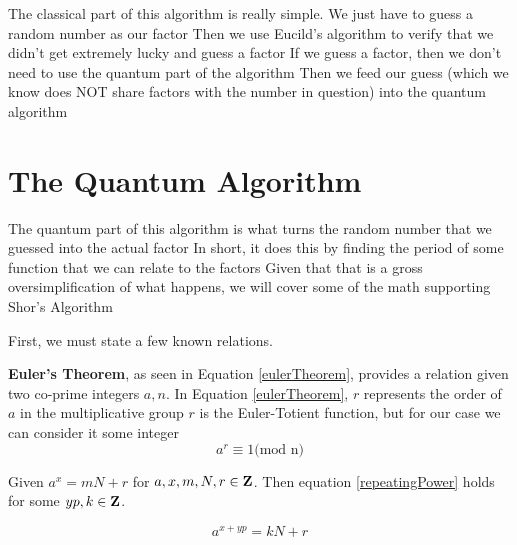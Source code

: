 \documentclass[a4paper]{article}
\begin{document}
\label{classicalSec}

The classical part of this algorithm is really simple. We just have to guess a random number as our factor
 Then we use Eucild's algorithm to verify that we didn't get extremely lucky and guess a factor
 If we guess a factor, then we don't need to use the quantum part of the algorithm
 Then we feed our guess (which we know does NOT share factors with the number in question) into the quantum algorithm




\section{The Quantum Algorithm}

\label{quantumSec}



The quantum part of this algorithm is what turns the random number that we guessed into the actual factor
 In short, it does this by finding the period of some function that we can relate to the factors
 Given that that is a gross oversimplification of what happens, we will cover some of the math supporting Shor's Algorithm


First, we must state a few known relations. 





\textbf{Euler's Theorem}, as seen in Equation \ref{eulerTheorem}, provides a relation given two co-prime integers
 $a, n$. In Equation \ref{eulerTheorem}, $r$ represents the order of $a$ in the multiplicative group
 $r$ is the Euler-Totient function, but for our case we can consider it some integer
\begin{equation}

a ^ r \equiv 1 \textrm{(mod n)}

\label{eulerTheorem}

\end{equation}





Given $a^x = mN + r$ for $a,x,m,N,r \in \mathbf{Z}$. Then equation \ref{repeatingPower} holds for some $y
 p, k \in \mathbf{Z}$.

\begin{equation}

a^{x + yp} = kN + r

\label{repeatingPower}

\end{equation}
\end{document}
